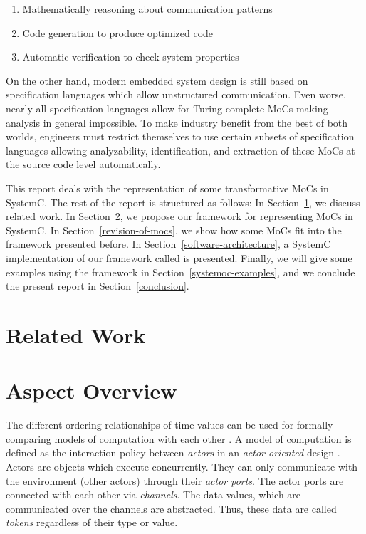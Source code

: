 \begin{enumerate}
\item Mathematically reasoning about communication patterns

\item Code generation to produce optimized code

\item Automatic verification to check system properties
\end{enumerate}

On the other hand, modern embedded system design is still based on
specification languages which allow unstructured communication.
Even worse, nearly all specification languages allow for Turing
complete MoCs making analysis in general impossible.
To make industry benefit from the best of both worlds,
engineers must restrict themselves to use certain subsets of
specification languages allowing analyzability, identification,
and extraction of these MoCs at the source code level automatically.

This report deals with the representation of some transformative
MoCs in SystemC. The rest of the report is structured as follows:
In Section~\ref{related-work}, we discuss related work. In
Section~\ref{aspect-overview}, we propose our framework for
representing MoCs in SystemC. In Section~\ref{revision-of-mocs},
we show how some MoCs fit into
the framework presented before. In Section~\ref{software-architecture},
a SystemC implementation of our framework called \SysteMoC{} is
presented. Finally, we will give some examples using the \SysteMoC{}
framework in Section~\ref{systemoc-examples}, and we conclude
the present report in Section~\ref{conclusion}.

\section{Related Work}\label{related-work}

\section{Aspect Overview}\label{aspect-overview}

The different ordering relationships of time values can be
used for formally comparing models of computation with each other \cite{Lee98}.
A model of computation \cite{embsft:2002} is defined as the 
interaction policy between \emph{actors} in an \emph{actor-oriented} design
\cite{agha97abstracting:1997}. Actors are objects which execute concurrently. They can only
communicate with the environment (other actors) through their \emph{actor ports}.
The actor ports are connected with each other via \emph{channels}.
The data values, which are communicated over the channels
are abstracted. Thus, these data are called \emph{tokens} regardless
of their type or value.

